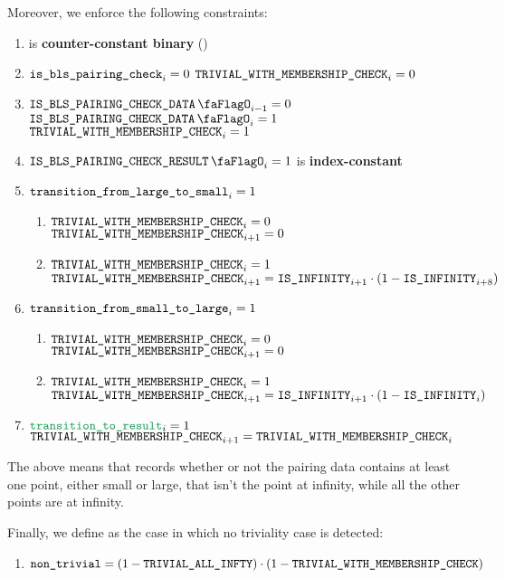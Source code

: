 Moreover, we enforce the following constraints:
\begin{enumerate}
    \item \trivialWithMembershipCheck{} is \textbf{counter-constant binary} \quad (\trash)
    \item \If $\texttt{is\_bls\_pairing\_check} _{i} = 0$ \Then $\texttt{TRIVIAL\_WITH\_MEMBERSHIP\_CHECK} _{i} = 0$
    \item \If $\isBlsPairingCheckData_{i - 1} = 0$ \et $\isBlsPairingCheckData _{i} = 1$ \Then $\texttt{TRIVIAL\_WITH\_MEMBERSHIP\_CHECK}_{i} = 1$
    \item \If $\isBlsPairingCheckResult_{i} = 1$ \Then \trivialWithMembershipCheck{} is \textbf{index-constant}
    \item \If $\texttt{transition\_from\_large\_to\_small}_{i} = 1$ \Then 
          \begin{enumerate}
              \item \If $\texttt{TRIVIAL\_WITH\_MEMBERSHIP\_CHECK} _{i} = 0$ \Then $\texttt{TRIVIAL\_WITH\_MEMBERSHIP\_CHECK} _{i + 1} = 0$
              \item \If $\texttt{TRIVIAL\_WITH\_MEMBERSHIP\_CHECK} _{i} = 1$ \Then $\texttt{TRIVIAL\_WITH\_MEMBERSHIP\_CHECK} _{i + 1} = \texttt{IS\_INFINITY}_{i + 1} \cdot (1 - \texttt{IS\_INFINITY}_{i + 8})$
          \end{enumerate}
    \item \If $\texttt{transition\_from\_small\_to\_large}_{i} = 1$ \Then
          \begin{enumerate}
              \item \If $\texttt{TRIVIAL\_WITH\_MEMBERSHIP\_CHECK} _{i} = 0$ \Then $\texttt{TRIVIAL\_WITH\_MEMBERSHIP\_CHECK} _{i + 1} = 0$
              \item \If $\texttt{TRIVIAL\_WITH\_MEMBERSHIP\_CHECK} _{i} = 1$ \Then $\texttt{TRIVIAL\_WITH\_MEMBERSHIP\_CHECK} _{i + 1} = \texttt{IS\_INFINITY}_{i + 1} \cdot (1 - \texttt{IS\_INFINITY}_{i})$
          \end{enumerate}
    \item \If $\locTransitionToResult_{i} = 1$ \Then $\texttt{TRIVIAL\_WITH\_MEMBERSHIP\_CHECK}_{i+1} = \texttt{TRIVIAL\_WITH\_MEMBERSHIP\_CHECK}_{i}$
\end{enumerate}
\saNote{} The above means that \trivialWithMembershipCheck{} records whether or not the pairing data contains at least one point, either small or large, that isn't the point at infinity, while all the other points are at infinity.

Finally, we define \locNonTrivial{} as the case in which no triviality case is detected:
\begin{enumerate}
    \item $\texttt{non\_trivial} = (1 - \texttt{TRIVIAL\_ALL\_INFTY}) \cdot (1 - \texttt{TRIVIAL\_WITH\_MEMBERSHIP\_CHECK})$
\end{enumerate}

